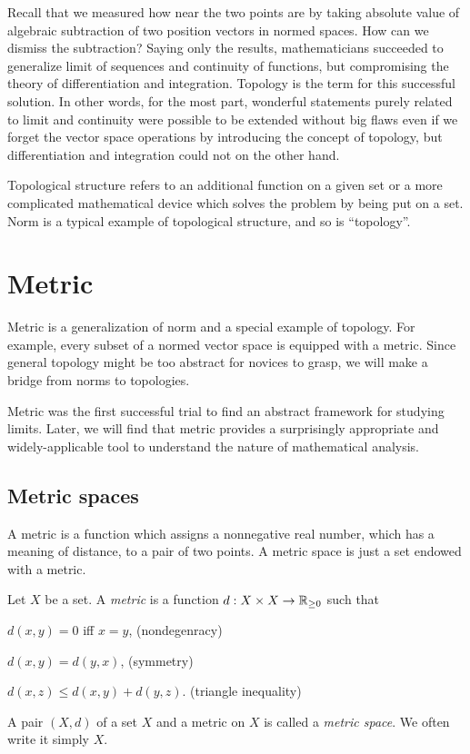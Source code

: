 \documentclass{../crs}
\begin{document}
Recall that we measured how near the two points are by taking absolute value of algebraic subtraction of two position vectors in normed spaces.
How can we dismiss the subtraction?
Saying only the results, mathematicians succeeded to generalize limit of sequences and continuity of functions, but compromising the theory of differentiation and integration.
Topology is the term for this successful solution.
In other words, for the most part, wonderful statements purely related to limit and continuity were possible to be extended without big flaws even if we forget the vector space operations by introducing the concept of topology, but differentiation and integration could not on the other hand.
 
Topological structure refers to an additional function on a given set or a more complicated mathematical device which solves the problem by being put on a set.
Norm is a typical example of topological structure, and so is ``topology''.


\section{Metric}

Metric is a generalization of norm and a special example of topology.
For example, every subset of a normed vector space is equipped with a metric.
Since general topology might be too abstract for novices to grasp, we will make a bridge from norms to topologies.

Metric was the first successful trial to find an abstract framework for studying limits.
Later, we will find that metric provides a surprisingly appropriate and widely-applicable tool to understand the nature of mathematical analysis.

\subsection{Metric spaces}

A metric is a function which assigns a nonnegative real number, which has a meaning of distance, to a pair of two points.
A metric space is just a set endowed with a metric.

\begin{defn}
Let $X$ be a set.
A \emph{metric} is a function $d:X\x X\to\R_{\ge0}$ such that
\begin{cond}
\item $d(x,y)=0$ iff $x=y$, \hfill(nondegenracy)
\item $d(x,y)=d(y,x)$, \hfill(symmetry)
\item $d(x,z)\le d(x,y)+d(y,z)$. \hfill(triangle inequality)
\end{cond}
A pair $(X,d)$ of a set $X$ and a metric on $X$ is called a \emph{metric space}.
We often write it simply $X$.
\end{defn}
\end{document}
